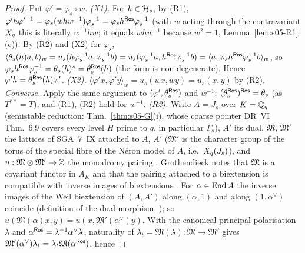 \begin{proof}
Put $\varphi'=\varphi_s\circ w$. \emph{(X1).} For $h\in\mathcal{H}_s$, by (R1),
$\varphi'h\varphi'^{-1}=\varphi_s(whw^{-1})\varphi_s^{-1}=\varphi_sh^{\mathsf{Ros}}\varphi_s^{-1}$ (with $w$ acting through the contravariant $X_q$ this is literally $w^{-1}hw$; it equals $whw^{-1}$ because $w^2=1$, Lemma~\ref{lem:s05-R1}(c)). By (R2) and (X2) for $\varphi_s$,
$\langle\theta_s(h)a,b\rangle_w=u_s(h\varphi_s^{-1}a,\varphi_s^{-1}b)=u_s(\varphi_s^{-1}a,h^{\mathsf{Ros}}\varphi_s^{-1}b)=\langle a,\varphi_sh^{\mathsf{Ros}}\varphi_s^{-1}b\rangle_w$, so
$\varphi_sh^{\mathsf{Ros}}\varphi_s^{-1}=\theta_s(h)^*=\theta^{\mathsf{Ros}}_s(h)$ (the form is non-degenerate). Hence $\varphi'h=\theta^{\mathsf{Ros}}_s(h)\varphi'$.
\emph{(X2).} $\langle\varphi'x,\varphi'y\rangle_w=u_s(wx,wy)=u_s(x,y)$ by (R2).
\emph{Converse.} Apply the same argument to $(\varphi',\theta^{\mathsf{Ros}}_s)$ and $w^{-1}$: $(\theta^{\mathsf{Ros}}_s)^{\mathsf{Ros}}=\theta_s$ (as $T^{**}=T$), and (R1), (R2)
hold for $w^{-1}$.
\emph{(R2).} Write $A=J_s$ over $K=\mathbb{Q}_q$ (semistable reduction: Thm.~\ref{thm:s05-G}(i), whose coarse pointer DR~VI Thm.~6.9 covers every level $H$ prime to $q$, in particular $\Gamma_s$), $A'$ its dual, $\mathfrak{M}$, $\mathfrak{M}'$ the lattices of SGA~7~IX
attached to $A$, $A'$ ($\mathfrak{M}'$ is the character group of the torus of the special fibre of the Néron model of $A$, i.e.\ $X_q(J_s)$), and
$u:\mathfrak{M}\otimes \mathfrak{M}'\to\mathbb{Z}$ the monodromy pairing
. Grothendieck notes that $\mathfrak{M}$ is a covariant functor in $A_K$ and that the pairing attached to a biextension is compatible with
inverse images of biextensions
. For $\alpha\in\operatorname{End} A$ the inverse images of the Weil biextension of $(A,A')$ along
$(\alpha,1)$ and along $(1,\alpha^\vee)$ coincide (definition of the dual morphism, \stknown); so $u(\mathfrak{M}(\alpha)x,y)=u(x,\mathfrak{M}'(\alpha^\vee)y)$. With the canonical
principal polarisation $\lambda$ and $\alpha^{\mathsf{Ros}}=\lambda^{-1}\alpha^\vee\lambda$, naturality of $\lambda_t=\mathfrak{M}(\lambda):\mathfrak{M}\to \mathfrak{M}'$ gives $\mathfrak{M}'(\alpha^\vee)\lambda_t=\lambda_t\mathfrak{M}(\alpha^{\mathsf{Ros}})$, hence

\end{proof}
